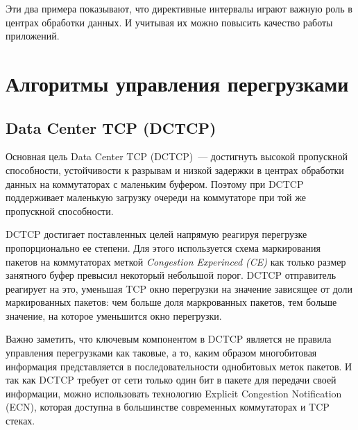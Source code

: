 \documentclass[14pt, a4paper,oneside]{extarticle}
\begin{document}
Эти два примера показывают, что директивные интервалы играют важную роль в центрах обработки данных. И учитывая их можно повысить качество работы приложений.
\newpage

\section{Алгоритмы управления перегрузками}
\subsection{Data Center TCP (DCTCP)}
Основная цель Data Center TCP (DCTCP)~--- достигнуть высокой пропускной способности, устойчивости к разрывам и низкой задержки в центрах обработки данных на коммутаторах с маленьким буфером. Поэтому при DCTCP поддерживает маленькую загрузку очереди на коммутаторе при той же пропускной способности.

DCTCP достигает поставленных целей напрямую реагируя перегрузке пропорционально ее степени. Для этого используется схема маркирования пакетов на коммутаторах меткой \emph{Congestion Experinced (CE)} как только размер занятного буфер превысил некоторый небольшой порог. DCTCP отправитель реагирует на это, уменьшая TCP окно перегрузки на значение зависящее от доли маркированных пакетов: чем больше доля маркрованных пакетов, тем больше значение, на которое уменьшится окно перегрузки.

Важно заметить, что ключевым компонентом в DCTCP является не правила управления перегрузками как таковые, а то, каким образом многобитовая информация представляется в последовательности однобитовых меток пакетов. И так как DCTCP требует от сети только один бит в пакете для передачи своей информации, можно использовать технологию Explicit Congestion Notification (ECN), которая доступна в большинстве современных коммутаторах и TCP стеках.
\end{document}
